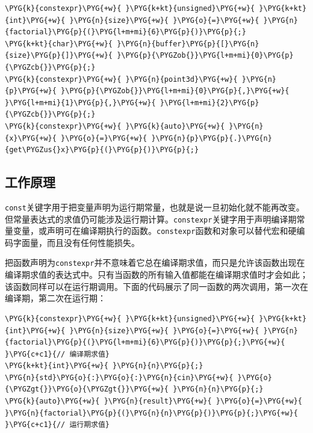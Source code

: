 \begin{itemize}
\begin{codeblockbg}
\begin{Verbatim}[commandchars=\\\{\},breaklines=true,breakanywhere=true,fontsize=\codefont,xleftmargin=17bp]
\PYG{k}{constexpr}\PYG{+w}{ }\PYG{k+kt}{unsigned}\PYG{+w}{ }\PYG{k+kt}{int}\PYG{+w}{ }\PYG{n}{size}\PYG{+w}{ }\PYG{o}{=}\PYG{+w}{ }\PYG{n}{factorial}\PYG{p}{(}\PYG{l+m+mi}{6}\PYG{p}{)}\PYG{p}{;}
\PYG{k+kt}{char}\PYG{+w}{ }\PYG{n}{buffer}\PYG{p}{[}\PYG{n}{size}\PYG{p}{]}\PYG{+w}{ }\PYG{p}{\PYGZob{}}\PYG{l+m+mi}{0}\PYG{p}{\PYGZcb{}}\PYG{p}{;}
\PYG{k}{constexpr}\PYG{+w}{ }\PYG{n}{point3d}\PYG{+w}{ }\PYG{n}{p}\PYG{+w}{ }\PYG{p}{\PYGZob{}}\PYG{l+m+mi}{0}\PYG{p}{,}\PYG{+w}{ }\PYG{l+m+mi}{1}\PYG{p}{,}\PYG{+w}{ }\PYG{l+m+mi}{2}\PYG{p}{\PYGZcb{}}\PYG{p}{;}
\PYG{k}{constexpr}\PYG{+w}{ }\PYG{k}{auto}\PYG{+w}{ }\PYG{n}{x}\PYG{+w}{ }\PYG{o}{=}\PYG{+w}{ }\PYG{n}{p}\PYG{p}{.}\PYG{n}{get\PYGZus{}x}\PYG{p}{(}\PYG{p}{)}\PYG{p}{;}
\end{Verbatim}
\end{codeblockbg}

\end{itemize}



\subsection{工作原理}



\texttt{const}关键字用于把变量声明为运行期常量，也就是说一旦初始化就不能再改变。但常量表达式的求值仍可能涉及运行期计算。\texttt{constexpr}关键字用于声明编译期常量变量，或声明可在编译期执行的函数。\texttt{constexpr}函数和对象可以替代宏和硬编码字面量，而且没有任何性能损失。



\begin{myNote}
把函数声明为\texttt{constexpr}并不意味着它总在编译期求值，而只是允许该函数出现在编译期求值的表达式中。只有当函数的所有输入值都能在编译期求值时才会如此；该函数同样可以在运行期调用。下面的代码展示了同一函数的两次调用，第一次在编译期，第二次在运行期：
\end{myNote}



\begin{codeblockbg}
\begin{Verbatim}[commandchars=\\\{\},breaklines=true,breakanywhere=true,fontsize=\codefont,xleftmargin=17bp]
\PYG{k}{constexpr}\PYG{+w}{ }\PYG{k+kt}{unsigned}\PYG{+w}{ }\PYG{k+kt}{int}\PYG{+w}{ }\PYG{n}{size}\PYG{+w}{ }\PYG{o}{=}\PYG{+w}{ }\PYG{n}{factorial}\PYG{p}{(}\PYG{l+m+mi}{6}\PYG{p}{)}\PYG{p}{;}\PYG{+w}{ }\PYG{c+c1}{// 编译期求值}
\PYG{k+kt}{int}\PYG{+w}{ }\PYG{n}{n}\PYG{p}{;}
\PYG{n}{std}\PYG{o}{:}\PYG{o}{:}\PYG{n}{cin}\PYG{+w}{ }\PYG{o}{\PYGZgt{}}\PYG{o}{\PYGZgt{}}\PYG{+w}{ }\PYG{n}{n}\PYG{p}{;}
\PYG{k}{auto}\PYG{+w}{ }\PYG{n}{result}\PYG{+w}{ }\PYG{o}{=}\PYG{+w}{ }\PYG{n}{factorial}\PYG{p}{(}\PYG{n}{n}\PYG{p}{)}\PYG{p}{;}\PYG{+w}{                 }\PYG{c+c1}{// 运行期求值}
\end{Verbatim}
\end{codeblockbg}


